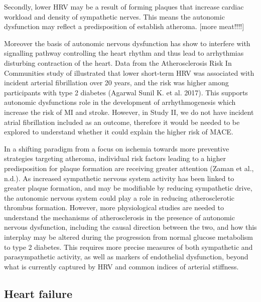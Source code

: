 \documentclass[
  a4paper,
  headsepline=true,
  open=any]{scrbook}
\begin{document}
Secondly, lower HRV may be a result of forming plaques that increase
cardiac workload and density of sympathetic nerves. This means the
autonomic dysfunction may reflect a predisposition of establish
atheroma. {[}more meat!!!!{]}

Moreover the basis of autonomic nervous dysfunction has show to
interfere with signalling pathway controlling the heart rhythm and thus
lead to arrhythmias disturbing contraction of the heart. Data from the
Atherosclerosis Risk In Communities study of illustrated that lower
short-term HRV was associated with incident arterial fibrillation over
20 years, and the risk was higher among participants with type 2
diabetes (Agarwal Sunil K. et al. 2017). This supports autonomic
dysfunctions role in the development of arrhythmogenesis which increase
the risk of MI and stroke. However, in Study II, we do not have incident
atrial fibrillation included as an outcome, therefore it would be needed
to be explored to understand whether it could explain the higher risk of
MACE.

In a shifting paradigm from a focus on ischemia towards more preventive
strategies targeting atheroma, individual risk factors leading to a
higher predisposition for plaque formation are receiving greater
attention (Zaman et al., n.d.). As increased sympathetic nervous system
activity has been linked to greater plaque formation, and may be
modifiable by reducing sympathetic drive, the autonomic nervous system
could play a role in reducing atherosclerotic thrombus formation.
However, more physiological studies are needed to understand the
mechanisms of atherosclerosis in the presence of autonomic nervous
dysfunction, including the causal direction between the two, and how
this interplay may be altered during the progression from normal glucose
metabolism to type 2 diabetes. This requires more precise measures of
both sympathetic and parasympathetic activity, as well as markers of
endothelial dysfunction, beyond what is currently captured by HRV and
common indices of arterial stiffness.

\hypertarget{heart-failure-1}{%
\subsection{Heart failure}\label{heart-failure-1}}
\end{document}
